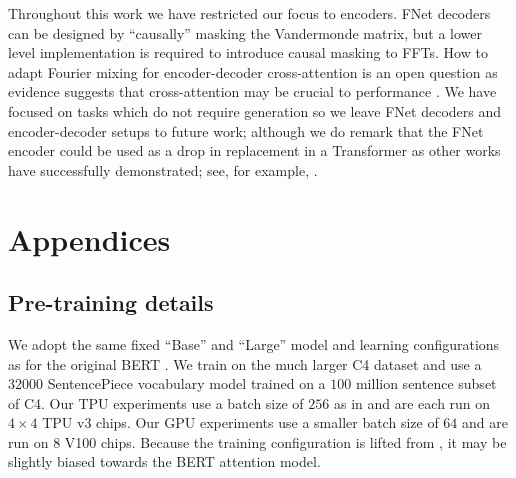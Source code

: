 \documentclass[11pt]{article}
\begin{document}
Throughout this work we have restricted our focus to encoders. FNet decoders can be designed by ``causally'' masking the Vandermonde matrix, but a lower level implementation is required to introduce causal masking to FFTs. How to adapt Fourier mixing for encoder-decoder cross-attention is an open question as evidence suggests that cross-attention may be crucial to performance \citep{you2020hard}. We have focused on tasks which do not require generation so we leave FNet decoders and encoder-decoder setups to future work; although we do remark that the FNet encoder could be used as a drop in replacement in a Transformer as other works have successfully demonstrated; see, for example, \cite{zaheer2020big, guo2021longt5}.
 





\appendix
\clearpage

\section{Appendices}
\label{sec:appendix}


\subsection{Pre-training details}
\label{app:mlm}

We adopt the same fixed ``Base'' and ``Large'' model and learning configurations as for the original BERT \citep{devlin2018bert}. We train on the much larger C4 dataset \citep{raffel2019exploring} and use a $32000$ SentencePiece  vocabulary model \citep{kudo2018sentencepiece} trained on a $100$ million sentence subset of C4. Our TPU experiments use a batch size of $256$ as in \citet{devlin2018bert} and are each run on $4\times4$ TPU v3 chips. Our GPU experiments use a smaller batch size of $64$ and are run on $8$ V100 chips. Because the training configuration is lifted from \citet{devlin2018bert}, it may be slightly biased towards the BERT attention model.
\end{document}
